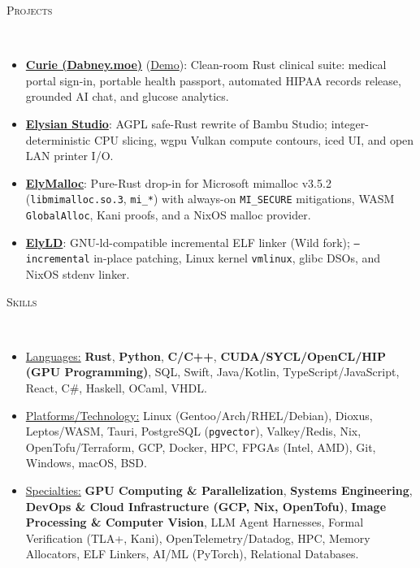 \documentclass[8pt]{article}
\newenvironment{changemargin}[2]{%
  \begin{list}{}{%
    \setlength{\topsep}{0pt}%
    \setlength{\leftmargin}{#1}%
    \setlength{\rightmargin}{#2}%
    \setlength{\listparindent}{\parindent}%
    \setlength{\itemindent}{\parindent}%
    \setlength{\parsep}{0pt}%
    \setlength{\itemsep}{-2pt}%
  }%
  \item[]}{\end{list}
}
\newcommand{\lineover}{
	\begin{changemargin}{-0.05in}{-0.05in}
		\vspace*{-10pt}
		\hrulefill \\
		\vspace*{-4pt}
	\end{changemargin}
}
\newcommand{\header}[1]{
	\begin{changemargin}{-0.5in}{-0.5in}
		\scshape{#1}\\
  	\lineover
	\end{changemargin}
}
\newenvironment{body} {
	\vspace*{-10pt}
	\begin{changemargin}{-0.25in}{-0.5in}
  }	
	{\end{changemargin}
}
\begin{document}
\header{Projects}
\begin{body}
	\vspace{7pt}
	\begin{itemize} \itemsep -2pt
		\item \textbf{\href{https://dabney.moe/clinical}{Curie (Dabney.moe)}} (\href{https://dabney.moe/clinical/patient}{Demo}): Clean-room Rust clinical suite: medical portal sign-in, portable health passport, automated HIPAA records release, grounded AI chat, and glucose analytics.
		\item \textbf{\href{https://github.com/tyler274/elysian-studio}{Elysian Studio}}: AGPL safe-Rust rewrite of Bambu Studio; integer-deterministic CPU slicing, wgpu Vulkan compute contours, iced UI, and open LAN printer I/O.
		\item \textbf{\href{https://github.com/tyler274/ElyMalloc}{ElyMalloc}}: Pure-Rust drop-in for Microsoft mimalloc v3.5.2 (\texttt{libmimalloc.so.3}, \texttt{mi\_*}) with always-on \texttt{MI\_SECURE} mitigations, WASM \texttt{GlobalAlloc}, Kani proofs, and a NixOS malloc provider.
		\item \textbf{\href{https://github.com/tyler274/ElyLD}{ElyLD}}: GNU-ld-compatible incremental ELF linker (Wild fork); \texttt{--incremental} in-place patching, Linux kernel \texttt{vmlinux}, glibc DSOs, and NixOS stdenv linker.
	\end{itemize}
\end{body}

\vspace*{-8pt}

\header{Skills}
\begin{body}
	\vspace{7pt}
	\begin{itemize} \itemsep -2pt
		\item \uline{Languages:} \textbf{Rust}, \textbf{Python}, \textbf{C/C++},
		\textbf{CUDA/SYCL/OpenCL/HIP (GPU Programming)}, SQL, Swift, Java/Kotlin, TypeScript/JavaScript, React, C\#,
		Haskell, OCaml, VHDL.
		\item \uline{Platforms/Technology:} Linux (Gentoo/Arch/RHEL/Debian), Dioxus, Leptos/WASM, Tauri, PostgreSQL (\texttt{pgvector}), Valkey/Redis, Nix, OpenTofu/Terraform, GCP, Docker, HPC, FPGAs (Intel, AMD), Git, Windows, macOS, BSD.
		\item \uline{Specialties:} \textbf{GPU Computing \& Parallelization}, \textbf{Systems Engineering}, \textbf{DevOps \& Cloud Infrastructure (GCP, Nix, OpenTofu)}, \textbf{Image Processing \& Computer Vision}, LLM Agent Harnesses, Formal Verification (TLA+, Kani), OpenTelemetry/Datadog, HPC, Memory Allocators, ELF Linkers, AI/ML (PyTorch), Relational Databases.
	\end{itemize}
\end{body}
\end{document}
